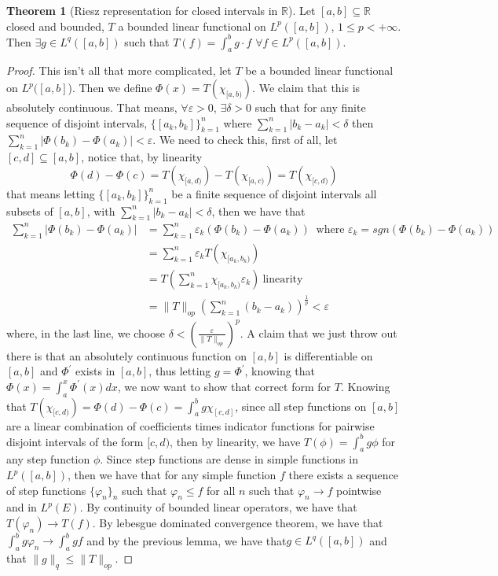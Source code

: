 \documentclass[13pt]{article}
\theoremstyle{definition} --- default
\newtheorem{theorem}{Theorem}
\theoremstyle{definition}
\theoremstyle{remark}
\begin{document}
	\begin{theorem}[Riesz representation for closed intervals in $\mathbb{R}$]
		Let $[a,b] \subseteq \mathbb{R}$ closed and bounded, $T$ a bounded linear functional on $L^p([a,b])$, $1 \leq p < +\infty$. Then $\exists g \in L^q([a,b])$ such that $T(f) = \int_{a}^b g \cdot f $ $\forall f \in L^p([a,b])$.
		
	\end{theorem}
	\begin{proof}
		This isn't all that more complicated, let $T$ be a bounded linear functional on $L^p([a,b]$). Then we define $\Phi(x) = T(\chi_{[a,b)})$. We claim that this is absolutely continuous. That means, $\forall \varepsilon > 0$, $\exists \delta > 0$ such that for any finite sequence of disjoint intervals, $\{[a_k,b_k]\}_{k=1}^n$ where $\sum_{k=1}^n |b_k-a_k| < \delta$ then $\sum_{k=1}^n |\Phi(b_k) - \Phi(a_k)| < \varepsilon$. We need to check this, first of all, let $[c,d] \subseteq [a,b]$, notice that, by linearity
		$$ \Phi(d) - \Phi(c)  = T(\chi_{[a,d)}) - T(\chi_{[a,c)}) = T(\chi_{[c,d)})$$
			that means letting $\{[a_k,b_k]\}_{k=1}^n$ be a finite sequence of disjoint intervals all subsets of $[a,b]$, with $\sum_{k=1}^n |b_k-a_k| < \delta$, then we have that 
			\begin{align*}\sum_{k=1}^n |\Phi(b_k) - \Phi(a_k)| &= \sum_{k=1}^n \varepsilon_k (\Phi(b_k) - \Phi(a_k))	\ \text{ where $\varepsilon_k = sgn(\Phi(b_k) - \Phi(a_k))$}\\
			&= \sum_{k=1}^n \varepsilon_k T(\chi_{[a_k,b_k)})\\
			&= T\left( \sum_{k=1}^n \chi_{[a_k,b_k)}\varepsilon_k\right) \ \text{linearity}\\
			&= \|T\|_{op} \left(\sum_{k=1}^n (b_k-a_k)\right)^\frac{1}{p} < \varepsilon
			\end{align*}
			where, in the last line, we choose $\displaystyle \delta  < \left(\frac{\varepsilon}{\|T\|_{op}}\right)^{p}$. 
			A claim that we just throw out there is that an absolutely continuous function on $[a,b]$ is differentiable on $[a,b]$  and $\Phi^\prime$ exists in $[a,b]$, thus letting $g = \Phi^\prime$, knowing that $\Phi(x) = \int_a^x \Phi^\prime(x)dx$, we now want to show that correct form for $T$. Knowing that $T(\chi_{[c,d)}) = \Phi(d) - \Phi(c) = \int_a^b g \chi_{[c,d]}$, since all step functions on $[a,b]$ are a linear combination of coefficients times indicator functions for pairwise disjoint intervals of the form $[c,d)$, then by linearity, we  have $T(\phi) = \int_a^b g \phi$ for any step function $\phi$. Since step functions are dense in simple functions in $L^p([a,b])$, then we have that for any simple function $f$ there exists a sequence of step functions $\{\varphi_n\}_n$ such that $\varphi_n \leq f$ for all $n$ such that $\varphi_n \to f$ pointwise and in $L^p(E)$. By continuity of bounded linear operators, we have that $T(\varphi_n) \to T(f)$. By lebesgue dominated convergence theorem, we have that $\int_a^b g \varphi_n \to \int_a^b g f$ and by the previous lemma, we have  that$g \in L^q([a,b])$ and that $\|g\|_q \leq \|T\|_{op}$. 

	\end{proof}
\end{document}

